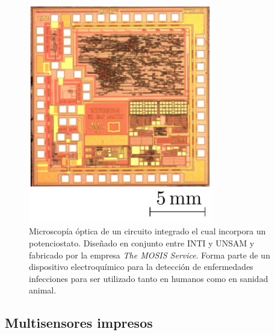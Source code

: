  			\begin{figure}[th!]
			    \begin{center}
			    \includegraphics[width=0.72\textwidth]{Imagenes/potenciostato-chip.pdf}
	       		\caption{Microscopía óptica de un circuito integrado el cual incorpora un potenciostato. Diseñado en conjunto entre INTI y UNSAM y fabricado por la empresa \textit{The MOSIS Service}. Forma parte de un dispositivo electroquímico para la detección de enfermedades infecciones para ser utilizado tanto en humanos como en sanidad animal.}
	         	\label{fig:pote-onchip}
	     		\end{center}
	     		\end{figure}

  \subsection{Multisensores impresos}

